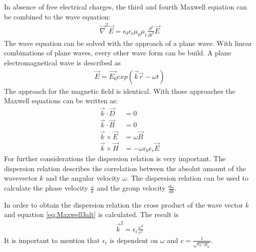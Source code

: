 \documentclass[ twoside,openright,titlepage,%
                paper=a4,fontsize=11pt,%
                ngerman
                ]{scrartcl}
\numberwithin{equation}{section}
\begin{document}
In absence of free electrical charges, the third and fourth Maxwell equation can be combined to the wave equation:
\begin{align}
\vec{\nabla}^2 \vec{E} = \epsilon_0 \epsilon_\text{r} \mu_0 \mu_\text{r} \frac{\partial^2}{\partial t^2} \vec{E} \label{eq:Waveequation}
\end{align} 
The wave equation can be solved with the approach of a plane wave. With linear combinations of plane waves, every other wave form can be build. A plane electromagnetical wave is described as
\begin{align}
\vec{E} = \vec{E_0} exp(\vec{k}\vec{r} - \omega t)
\end{align}
The approach for the magnetic field is identical. With those approaches the Maxwell equations can be written as:
\begin{align}
\vec{k} \cdot \vec{D} &= 0 \label{eq:Maxwell1alt} \\
\vec{k} \cdot \vec{B} &= 0 \label{eq:Maxwell2alt} \\
\vec{k} \times \vec{E} &= \omega \vec{B} \label{eq:Maxwell3alt} \\
\vec{k} \times \vec{H} &= -\omega \epsilon_0 \epsilon_r \vec{E} \label{eq:Maxwell4alt}
\end{align}
For further considerations the dispersion relation is very important. The dispersion relation describes the correlation between the absolut amount of the wavevector $k$ and the angular velocity $\omega$. The dispersion relation can be used to calculate the phase velocity $\frac{\omega}{k}$ and the group velocity $\frac{d\omega}{dk}$. 

In order to obtain the dispersion relation the cross product of the wave vector $k$ and equation \ref{eq:Maxwell3alt} is calculated. The result is
\begin{align}
\vec{k}^2 = \epsilon_\text{r} \frac{\omega^2}{c^2} \label{eq:Dispersionrelation}
\end{align}
It is important to mention that $\epsilon_\text{r}$ is dependent on $\omega$ and $c=\frac{1}{\sqrt{\epsilon_0 \cdot \mu_0}}$.
\end{document}
